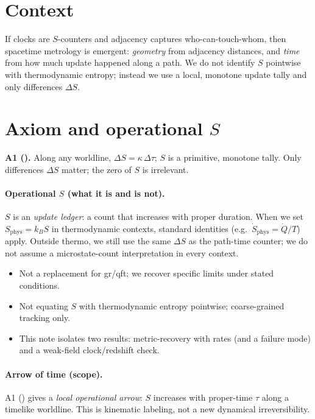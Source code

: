 \documentclass[11pt,a4paper]{article}
\begin{document}
\section*{Context}
If clocks are $S$-counters and adjacency captures who-can-touch-whom, then spacetime metrology is emergent: \emph{geometry} from adjacency distances, and \emph{time} from how much update happened along a path. We do not identify $S$ pointwise with thermodynamic entropy; instead we use a local, monotone update tally and only differences $\Delta S$.

\section[Axiom and operational S]{Axiom and operational \(S\)}
\textbf{A1 (\EtLaw).} Along any worldline, $\Delta S=\kappa\,\Delta\tau$; $S$ is a primitive, monotone tally. Only differences $\Delta S$ matter; the zero of $S$ is irrelevant.

\paragraph{Operational \(S\) (what it is and is not).}
$S$ is an \emph{update ledger}: a count that increases with proper duration. When we set $S_{\mathrm{phys}} = k_B S$ in thermodynamic contexts, standard identities (e.g.\ $\dot S_{\mathrm{phys}} = \dot Q/T$) apply. Outside thermo, we still use the same $\Delta S$ as the path-time counter; we do not assume a microstate-count interpretation in every context.

\begin{nongoalsbox}
\begin{itemize}
  \item Not a replacement for \gls{gr}/\gls{qft}; we recover specific limits under stated conditions.
  \item Not equating $S$ with thermodynamic entropy pointwise; coarse-grained tracking only.
  \item This note isolates two results: metric-recovery with rates (and a failure mode) and a weak-field clock/redshift check.
\end{itemize}
\end{nongoalsbox}

\paragraph{Arrow of time (scope).}
A1 (\EtLaw) gives a \emph{local operational arrow}: $S$ increases with \gls{proper-time} $\tau$ along a timelike worldline. This is kinematic labeling, not a new dynamical irreversibility.
\end{document}
